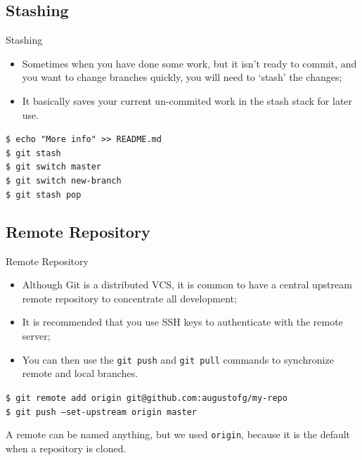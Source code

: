 \documentclass{beamer}
\begin{document}
\subsection{Stashing}
\begin{frame}{Stashing}
  \begin{itemize}
    \item Sometimes when you have done some work, but it isn't ready to commit, and you want to change branches quickly, you will need to `stash' the changes;
    \item It basically saves your current un-commited work in the stash stack for later use.
  \end{itemize}
  \begin{block}{}
    \texttt{\$ echo "More info" >> README.md} \\
    \texttt{\$ git stash} \\
    \texttt{\$ git switch master} \\
    \texttt{\$ git switch new-branch} \\
    \texttt{\$ git stash pop}
  \end{block}
\end{frame}

\subsection{Remote Repository}
\begin{frame}{Remote Repository}
  \begin{itemize}
    \item Although Git is a distributed VCS, it is common to have a central upstream remote repository to concentrate all development;
    \item It is recommended that you use SSH keys to authenticate with the remote server;
    \item You can then use the \texttt{git push} and \texttt{git pull} commands to synchronize remote and local branches.
  \end{itemize}
  \begin{block}{}
    \texttt{\$ git remote add origin git@github.com:augustofg/my-repo} \\
    \texttt{\$ git push --set-upstream origin master}
  \end{block}
  A remote can be named anything, but we used \texttt{origin}, because it is the default when a repository is cloned.
\end{frame}
\end{document}
